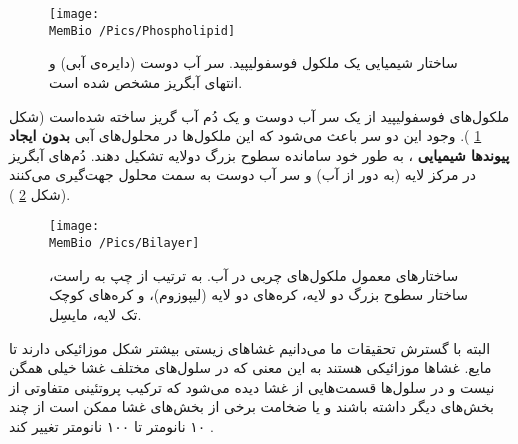  
 \begin{figure}[h]
\begin{center}
\texttt{[image: \\MemBio /Pics/Phospholipid]}
\caption{
ساختار شیمیایی یک ملکول فوسفولیپید. سر آب دوست (دایره‌ی آبی) و  انتهای آبگریز مشخص شده است.
}
\label{fig:phospholipid}
\end{center}
\end{figure}
 
 
 ملکول‌های فوسفولیپید از یک سر آب دوست
 و یک دُم آب گریز
 ساخته شده‌است (شکل
\ref{fig:phospholipid}
). وجود این دو سر باعث می‌شود که این ملکول‌ها در محلول‌های آبی
\textbf{بدون ایجاد پیوندها شیمیایی}
، به طور خود سامانده
 سطوح بزرگ دولایه تشکیل دهند.  دُم‌های  آبگریز در مرکز لایه (به دور از آب) و سر آب دوست به سمت محلول جهت‌گیری می‌کنند (شکل
\ref{fig:bilayer}
 ).
\begin{figure}[h]
\begin{center}
\texttt{[image: \\MemBio /Pics/Bilayer]}
\caption{
ساختار‌های معمول ملکول‌های چربی در آب. به ترتیب از چپ به راست، ساختار سطوح بزرگ دو لایه، کره‌های دو لایه (لیپوزوم)، و کره‌های کوچک تک لایه، مایسِل.
}
\label{fig:bilayer}
\end{center}
\end{figure}
البته با گسترش تحقیقات ما می‌دانیم غشا‌های زیستی بیشتر شکل موزائیکی دارند تا مایع. غشاها موزائیکی هستند به این معنی که در سلول‌های مختلف غشا خیلی همگن نیست و در سلول‌ها قسمت‌هایی از غشا دیده‌ می‌شود که ترکیب پروتئینی متفاوتی از بخش‌های دیگر داشته باشند و یا ضخامت برخی از بخش‌های غشا ممکن است از چند ۱۰ نانومتر تا ۱۰۰ نانومتر تغییر کند
\cite{Engelman:2005aa}
.
 
 
 
 
 
 
 
 
 
 
 
 
 
 
 